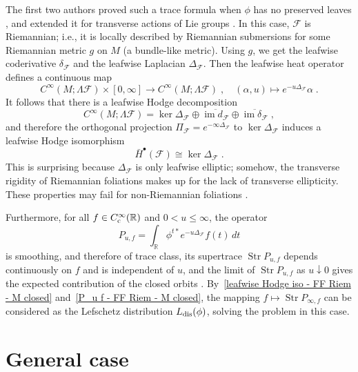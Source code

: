 \documentclass{memo-l}
\theoremstyle{plain}
\theoremstyle{definition}
\theoremstyle{remark}
\newcommand{\R}{\mathbb{R}}
\newcommand{\FF}{\mathcal{F}}
\newcommand{\im}{\operatorname{im}}
\newcommand{\Str}{\operatorname{Str}}
\newcommand{\Cinftyc}{C^\infty_{\text{\rm c}}}
\newcommand{\Ldis}{L_{\text{\rm dis}}}
\numberwithin{section}{chapter}
\numberwithin{equation}{section}%
\begin{document}
The first two authors proved such a trace formula when $\phi$ has no preserved leaves \cite{AlvKordy2002}, and extended it for transverse actions of Lie groups \cite{AlvKordy2008a}. In this case, $\FF$ is Riemannian; i.e., it is locally described by Riemannian submersions for some Riemannian metric $g$ on $M$ (a bundle-like metric). Using $g$, we get the leafwise coderivative $\delta_\FF$ and the leafwise Laplacian $\Delta_\FF$. Then the leafwise heat operator defines a continuous map \cite{AlvKordy2001}
\begin{equation}\label{heat op - FF Riem - M closed}
C^\infty(M;\Lambda\FF)\times[0,\infty]\to C^\infty(M;\Lambda\FF)\;,\quad(\alpha,u)\mapsto e^{-u\Delta_\FF}\alpha\;.
\end{equation}
It follows that there is a leafwise Hodge decomposition
\begin{equation}\label{leafwise Hodge dec - FF Riem - M closed}
C^\infty(M;\Lambda\FF)=\ker\Delta_\FF\oplus\overline{\im d_\FF}\oplus\overline{\im\delta_\FF}\;,
\end{equation}
and therefore the orthogonal projection $\Pi_\FF=e^{-\infty\Delta_\FF}$ to $\ker\Delta_\FF$ induces a leafwise Hodge isomorphism
\begin{equation}\label{leafwise Hodge iso - FF Riem - M closed}
\bar H^\bullet(\FF)\cong\ker\Delta_\FF\;.
\end{equation}
This is surprising because $\Delta_\FF$ is only leafwise elliptic; somehow, the transverse rigidity of Riemannian foliations makes up for the lack of transverse ellipticity. These properties may fail for non-Riemannian foliations \cite{DeningerSinghof2001}. 

Furthermore, for all $f\in\Cinftyc(\R)$ and $0<u\le\infty$, the operator
\begin{equation}\label{P_u f - FF Riem - M closed}
P_{u,f}=\int_\R\phi^{t*}e^{-u\Delta_\FF}f(t)\,dt
\end{equation}
is smoothing, and therefore of trace class, its supertrace $\Str P_{u,f}$ depends continuously on $f$ and is independent of $u$, and the limit of $\Str P_{u,f}$ as $u\downarrow0$ gives the expected contribution of the closed orbits \cite{AlvKordy2002,AlvKordy2008a}. By~\eqref{leafwise Hodge iso - FF Riem - M closed} and~\eqref{P_u f - FF Riem - M closed}, the mapping $f\mapsto\Str P_{\infty,f}$ can be considered as the Lefschetz distribution $\Ldis(\phi)$, solving the problem in this case. 


\section{General case}\label{s: general}
\end{document}
